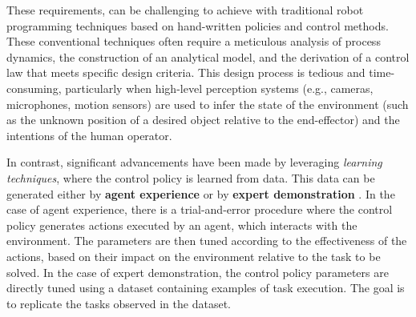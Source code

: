 These requirements, can be challenging to achieve with traditional robot programming techniques based on hand-written policies and control methods. These conventional techniques often require a meticulous analysis of process dynamics, the construction of an analytical model, and the derivation of a control law that meets specific design criteria. This design process is tedious and time-consuming, particularly when high-level perception systems (e.g., cameras, microphones, motion sensors) are used to infer the state of the environment (such as the unknown position of a desired object relative to the end-effector) and the intentions of the human operator.

In contrast, significant advancements have been made by leveraging \textit{learning techniques}, where the control policy is learned from data. This data can be generated either by \textbf{agent experience} \cite{sutton2018reinforcement} or by \textbf{expert demonstration} \cite{osa2018algorithmic}. In the case of agent experience, there is a trial-and-error procedure where the control policy generates actions executed by an agent, which interacts with the environment. The parameters are then tuned according to the effectiveness of the actions, based on their impact on the environment relative to the task to be solved. In the case of expert demonstration, the control policy parameters are directly tuned using a dataset containing examples of task execution. The goal is to replicate the tasks observed in the dataset.

